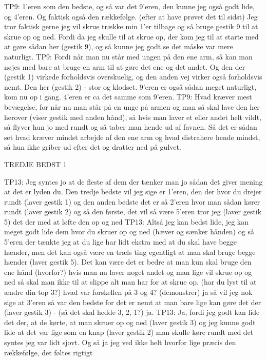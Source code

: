 TP9: 1’eren som den bedste, og så var det 9’eren, den kunne jeg også godt lide, og 4’eren. Og faktisk også den rækkefølge. (efter at have prøvet det til sidst) Jeg tror faktisk gerne jeg vil skrue trække min 1’er tilbage og så bruge gestik 9 til at skrue op og ned. Fordi da jeg skulle til at skrue op, der kom jeg til at starte med at gøre sådan her (gestik 9), og så kunne jeg godt se det måske var mere naturligt.
TP9: Fordi når man nu står med ungen på den ene arm, så kan man nøjes med bare at bruge en arm til at gøre det ene og det andet. Og den der (gestik 1) virkede forholdsvis overskuelig, og den anden vej virker også forholdsvis nemt. Den her (gestik 2) - stor og klodset. 9’eren er også sådan meget naturligt, kom nu op i gang. 4’eren er ca det samme som 9’eren. 
TP9: Hvad kræver mest bevægelse, for når nu man står på en unge på armen og man så skal lave den her herover (viser gestik med anden hånd), så hvis man laver et eller andet helt vildt, så flyver hun jo med rundt og så taber man hende ud af favnen. Så det er sådan set hvad kræver mindst arbejde af den ene arm og hvad distrahere hende mindst, så hun ikke griber ud efter det og dratter ned på gulvet. 

TREDJE BEDST 1

TP13: Jeg syntes jo at de fleste af dem der tænker man jo sådan det giver mening at det er lyden du. Den tredje bedste vil jeg sige er 1’eren, den der hvor du drejer rundt (laver gestik 1) og den anden bedste det er så 2’eren hvor man sådan kører rundt (laver gestik 2) og så den første, det vil så være 5’eren tror jeg (laver gestik 5) det der med at løfte den op og ned 
TP13: Altså jeg kan bedst lide, jeg kan meget godt lide dem hvor du skruer op og ned (hæver og sænker hånden) og så 5’eren der tænkte jeg at du lige har lidt ekstra med at du skal have begge hænder, men det kan også være en træls ting egentligt at man skal bruge begge hænder (laver gestik 5). Det kan være det er bedre at man kun skal bruge den ene hånd (hvorfor?) hvis man nu laver noget andet og man lige vil skrue op og ned så skal man ikke til at slippe alt man har for at skrue op. (har du lyst til at ændre din top 3?) hvad var forskellen på 3 og 4? (demonstrer) ja så vil jeg nok sige at 3’eren så var den bedste for det er nemt at man bare lige kan gøre det der (laver gestik 3) - (så det skal hedde 3, 2, 1?) ja.  
TP13: Ja, fordi jeg godt kan lide det der, at de kørte, at man skruer op og ned (laver gestik 3) og jeg kunne godt lide at det var lige som en knap (laver gestik 2) man skulle køre rundt med det syntes jeg var lidt sjovt. Og så ja jeg ved ikke helt hvorfor lige præcis den rækkefølge, det føltes rigtigt  




